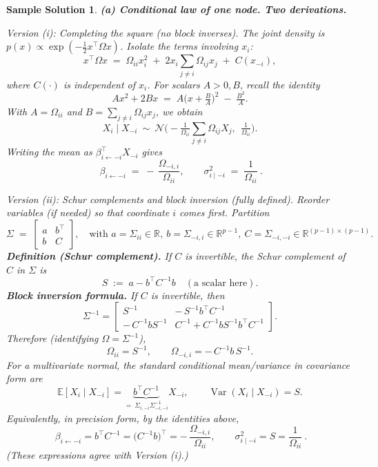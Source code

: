 \documentclass[11pt]{article}
\newtheorem*{solution}{Sample Solution}
\begin{document}
\begin{solution}
\textbf{(a) Conditional law of one node. Two derivations.}

\smallskip
\emph{Version (i): Completing the square (no block inverses).}
The joint density is \(p(x)\propto \exp(-\tfrac12 x^\top \Omega x)\).
Isolate the terms involving \(x_i\):
\[
x^\top \Omega x \;=\; \Omega_{ii} x_i^2 \;+\; 2x_i\!\!\sum_{j\neq i}\!\Omega_{ij} x_j \;+\; C(x_{-i}),
\]
where \(C(\cdot)\) is independent of \(x_i\).
For scalars \(A>0,B\), recall the identity
\[
Ax^2+2Bx \;=\; A\Big(x+\tfrac{B}{A}\Big)^2 \;-\; \tfrac{B^2}{A}.
\]
With \(A=\Omega_{ii}\) and \(B=\sum_{j\neq i}\Omega_{ij}x_j\), we obtain
\[
X_i \mid X_{-i}\ \sim\ \mathcal N\!\Big(-\tfrac{1}{\Omega_{ii}}\sum_{j\neq i}\Omega_{ij} X_j,\ \ \tfrac{1}{\Omega_{ii}}\Big).
\]
Writing the mean as \(\beta_{i\leftarrow -i}^\top X_{-i}\) gives
\[
\boxed{\ \beta_{i\leftarrow -i} \;=\; -\,\frac{\Omega_{-i,i}}{\Omega_{ii}}, \qquad
\sigma^2_{i\mid -i} \;=\; \frac{1}{\Omega_{ii}}\ }.
\]

\smallskip
\emph{Version (ii): Schur complements and block inversion (fully defined).}
Reorder variables (if needed) so that coordinate \(i\) comes first. Partition
\[
\Sigma \;=\; \begin{bmatrix}
a & b^\top\\[4pt]
b & C
\end{bmatrix},
\quad
\text{with } a=\Sigma_{ii}\in\mathbb{R},\ b=\Sigma_{-i,i}\in\mathbb{R}^{p-1},\ C=\Sigma_{-i,-i}\in\mathbb{R}^{(p-1)\times(p-1)} .
\]
\textbf{Definition (Schur complement).}
If \(C\) is invertible, the Schur complement of \(C\) in \(\Sigma\) is
\[
S \;:=\; a - b^\top C^{-1} b \quad (\text{a scalar here}).
\]
\textbf{Block inversion formula.}
If \(C\) is invertible, then
\[
\Sigma^{-1}
=\begin{bmatrix}
S^{-1} & -\,S^{-1} b^\top C^{-1}\\[4pt]
-\,C^{-1} b S^{-1} & C^{-1} + C^{-1} b S^{-1} b^\top C^{-1}
\end{bmatrix}.
\]
Therefore (identifying \(\Omega=\Sigma^{-1}\)),
\[
\Omega_{ii}=S^{-1},\qquad
\Omega_{-i,i}=-\,C^{-1} b\, S^{-1}.
\]
For a multivariate normal, the standard conditional mean/variance in \emph{covariance form} are
\[
\mathbb{E}[X_i\mid X_{-i}]=\underbrace{b^\top C^{-1}}_{=\ \Sigma_{i,-i}\Sigma_{-i,-i}^{-1}} X_{-i},\qquad
\operatorname{Var}(X_i\mid X_{-i})=S.
\]
Equivalently, in \emph{precision form}, by the identities above,
\[
\boxed{\ \beta_{i\leftarrow -i}=b^\top C^{-1}
=\Big(C^{-1} b\Big)^\top
= -\,\frac{\Omega_{-i,i}}{\Omega_{ii}},\qquad
\sigma^2_{i\mid -i}=S=\frac{1}{\Omega_{ii}}\ }.
\]
(These expressions agree with Version (i).)


\end{solution}
\end{document}
